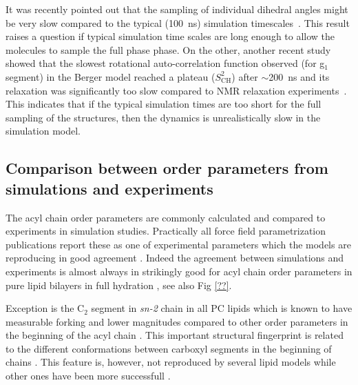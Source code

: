 \documentclass[aps,prl,superscriptaddress,twocolumn]{revtex4}
\begin{document}
It was recently pointed out that the sampling of individual dihedral angles might be very
slow compared to the typical (100~ns) simulation timescales~\cite{vogel12}.
This result raises a question if typical simulation time scales are long enough to allow
the molecules to sample the full phase phase. On the other, another recent study showed
that the slowest rotational auto-correlation function observed (for g$_1$ segment) 
in the Berger model reached a plateau ($S_\mathrm{CH}^2$) after $\sim$200~ns
and its relaxation was significantly too slow compared to NMR relaxation experiments~\cite{ferreira15}. 
This indicates that if the typical simulation times are too short for the full sampling
of the structures, then the dynamics is unrealistically slow in the simulation model.


\subsection{Comparison between order parameters from simulations and experiments}

The acyl chain order parameters are commonly calculated and compared to experiments
in simulation studies. Practically all force field parametrization publications report these
as one of experimental parameters which the models are reproducing in good agreement \cite{??}.
Indeed the agreement between simulations and experiments is almost always in strikingly good 
for acyl chain order parameters in pure lipid bilayers in full hydration \cite{??}, see also Fig \ref{??}.

Exception is the C$_2$ segment in {\it sn-2} chain in all PC lipids which is known
to have measurable forking and lower magnitudes compared to other order parameters in 
the beginning of the acyl chain \cite{??}. This important structural fingerprint is
related to the different conformations between carboxyl segments in the beginning of chains \cite{??}.
This feature is, however, not reproduced by several lipid models \cite{??} while other ones have been
more successfull \cite{??}.
\end{document}
